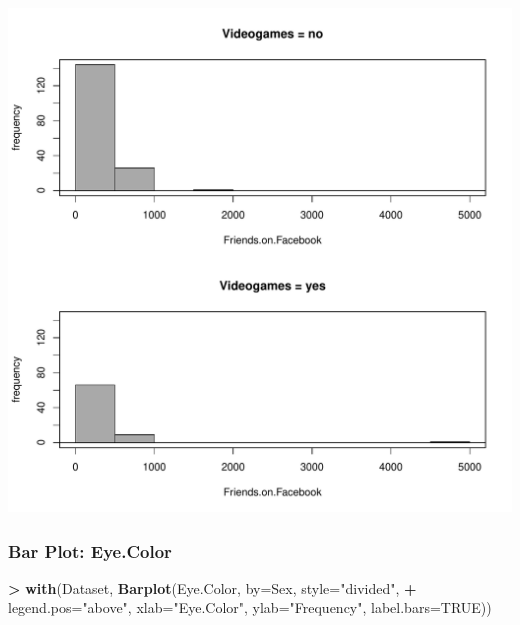 \documentclass[
]{article}
\newenvironment{Shaded}{\begin{snugshade}}{\end{snugshade}}
\newcommand{\AttributeTok}[1]{\textcolor[rgb]{0.13,0.29,0.53}{#1}}
\newcommand{\ConstantTok}[1]{\textcolor[rgb]{0.56,0.35,0.01}{#1}}
\newcommand{\FunctionTok}[1]{\textcolor[rgb]{0.13,0.29,0.53}{\textbf{#1}}}
\newcommand{\NormalTok}[1]{#1}
\newcommand{\SpecialCharTok}[1]{\textcolor[rgb]{0.81,0.36,0.00}{\textbf{#1}}}
\newcommand{\StringTok}[1]{\textcolor[rgb]{0.31,0.60,0.02}{#1}}
\begin{document}
\includegraphics[width=750px]{RcmdrMarkdown_files/figure-latex/unnamed-chunk-16-1}

\subsubsection{Bar Plot: Eye.Color}\label{bar-plot-eye.color}

\begin{Shaded}
\begin{Highlighting}[]
\SpecialCharTok{\textgreater{}} \FunctionTok{with}\NormalTok{(Dataset, }\FunctionTok{Barplot}\NormalTok{(Eye.Color, }\AttributeTok{by=}\NormalTok{Sex, }\AttributeTok{style=}\StringTok{"divided"}\NormalTok{, }
\SpecialCharTok{+}   \AttributeTok{legend.pos=}\StringTok{"above"}\NormalTok{, }\AttributeTok{xlab=}\StringTok{"Eye.Color"}\NormalTok{, }\AttributeTok{ylab=}\StringTok{"Frequency"}\NormalTok{, }\AttributeTok{label.bars=}\ConstantTok{TRUE}\NormalTok{))}
\end{Highlighting}
\end{Shaded}
\end{document}
